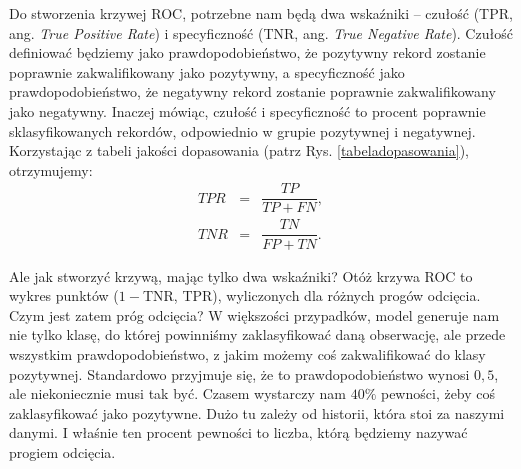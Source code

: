 \documentclass{mini}
\begin{document}
\vfill
\clearpage

Do stworzenia krzywej ROC, potrzebne nam będą dwa wskaźniki -- czułość (TPR, ang. \textit{True Positive Rate}) i specyficzność (TNR, ang. \textit{True Negative Rate}). Czułość definiować będziemy jako prawdopodobieństwo, że pozytywny rekord zostanie poprawnie zakwalifikowany jako pozytywny, a specyficzność jako prawdopodobieństwo, że negatywny rekord zostanie poprawnie zakwalifikowany jako negatywny. Inaczej mówiąc, czułość i specyficzność to procent poprawnie sklasyfikowanych rekordów, odpowiednio w grupie pozytywnej i negatywnej. Korzystając z tabeli jakości dopasowania (patrz Rys. \ref{tabeladopasowania}), otrzymujemy:
\begin{eqnarray*}
	TPR&=&\dfrac{TP}{TP+FN},\\
	TNR&=&\dfrac{TN}{FP+TN}.		
\end{eqnarray*}  

Ale jak stworzyć krzywą, mając tylko dwa wskaźniki? Otóż krzywa ROC to wykres punktów ($1-$TNR, TPR), wyliczonych dla różnych progów odcięcia. Czym jest zatem próg odcięcia? W większości przypadków, model generuje nam nie tylko klasę, do której powinniśmy zaklasyfikować daną obserwację, ale przede wszystkim prawdopodobieństwo, z jakim możemy coś zakwalifikować do klasy pozytywnej. Standardowo przyjmuje się, że to prawdopodobieństwo wynosi $0,5$, ale niekoniecznie musi tak być. Czasem wystarczy nam $40\%$ pewności, żeby coś zaklasyfikować jako pozytywne. Dużo tu zależy od historii, która stoi za naszymi danymi. I właśnie ten procent pewności to liczba, którą będziemy nazywać progiem odcięcia. 
\end{document}
